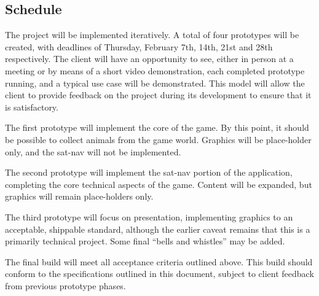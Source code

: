 \documentclass[12pt,a4paper,twoside]{article}
\begin{document}
\subsection{Schedule}
The project will be implemented iteratively.
A total of four prototypes will be created, with deadlines of Thursday, February 7th, 14th, 21st and 28th respectively.
The client will have an opportunity to see, either in person at a meeting or by means of a short video demonstration, each completed prototype running, and a typical use case will be demonstrated.
This model will allow the client to provide feedback on the project during its development to ensure that it is satisfactory.

The first prototype will implement the core of the game. By this point, it should be possible to collect animals from the game world. Graphics will be place-holder only, and the sat-nav will not be implemented.

The second prototype will implement the sat-nav portion of the application, completing the core technical aspects of the game. Content will be expanded, but graphics will remain place-holders only.

The third prototype will focus on presentation, implementing graphics to an acceptable, shippable standard, although the earlier caveat remains that this is a primarily technical project. Some final ``bells and whistles'' may be added.

The final build will meet all acceptance criteria outlined above. This build should conform to the specifications outlined in this document, subject to client feedback from previous prototype phases.
\end{document}
